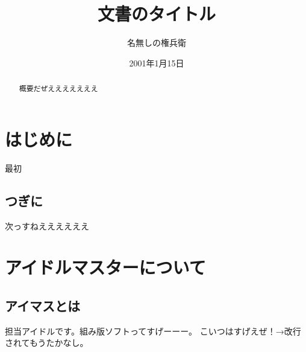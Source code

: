 \documentclass{ujarticle}
\begin{document}
\title{文書のタイトル}
\author{名無しの権兵衛}
\date{2001年1月15日}
\maketitle

\begin{abstract}
  概要だぜえええええええ
\end{abstract}

\section*{はじめに}
最初
\subsection*{つぎに}
次っすねええええええ
\section{アイドルマスターについて}
\subsection{アイマスとは}
担当アイドルです。組み版ソフトってすげーーー。
こいつはすげえぜ！→改行されてもうたかなし。\cite{KyTea}


\end{document}
